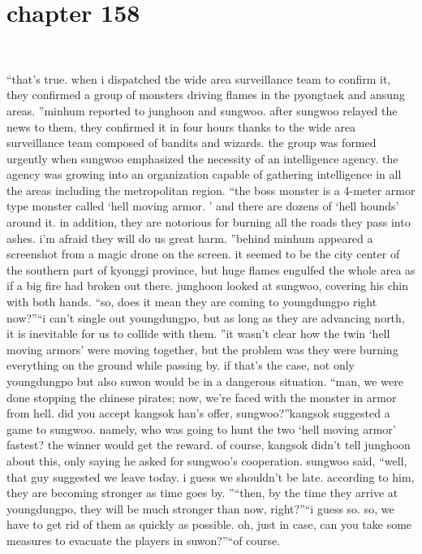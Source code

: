 \section{chapter 158}

                             




“that’s true.
 when i dispatched the wide area surveillance team to confirm it, they confirmed a group of monsters driving flames in the pyongtaek and ansung areas.
”minhum reported to junghoon and sungwoo.
after sungwoo relayed the news to them, they confirmed it in four hours thanks to the wide area surveillance team composed of bandits and wizards.
 the group was formed urgently when sungwoo emphasized the necessity of an intelligence agency.
 the agency was growing into an organization capable of gathering intelligence in all the areas including the metropolitan region.
“the boss monster is a 4-meter armor type monster called ‘hell moving armor.
’ and there are dozens of ‘hell hounds’ around it.
 in addition, they are notorious for burning all the roads they pass into ashes.
 i’m afraid they will do us great harm.
”behind minhum appeared a screenshot from a magic drone on the screen.
 it seemed to be the city center of the southern part of kyonggi province, but huge flames engulfed the whole area as if a big fire had broken out there.
junghoon looked at sungwoo, covering his chin with both hands.
“so, does it mean they are coming to youngdungpo right now?”“i can’t single out youngdungpo, but as long as they are advancing north, it is inevitable for us to collide with them.
”it wasn’t clear how the twin ‘hell moving armors’ were moving together, but the problem was they were burning everything on the ground while passing by.
 if that’s the case, not only youngdungpo but also suwon would be in a dangerous situation.
“man, we were done stopping the chinese pirates; now, we’re faced with the monster in armor from hell.
 did you accept kangsok han’s offer, sungwoo?”kangsok suggested a game to sungwoo.
 namely, who was going to hunt the two ‘hell moving armor’ fastest? the winner would get the reward.
of course, kangsok didn’t tell junghoon about this, only saying he asked for sungwoo’s cooperation.
sungwoo said, “well, that guy suggested we leave today.
 i guess we shouldn’t be late.
 according to him, they are becoming stronger as time goes by.
”“then, by the time they arrive at youngdungpo, they will be much stronger than now, right?”“i guess so.
 so, we have to get rid of them as quickly as possible.
 oh, just in case, can you take some measures to evacuate the players in suwon?”“of course.
